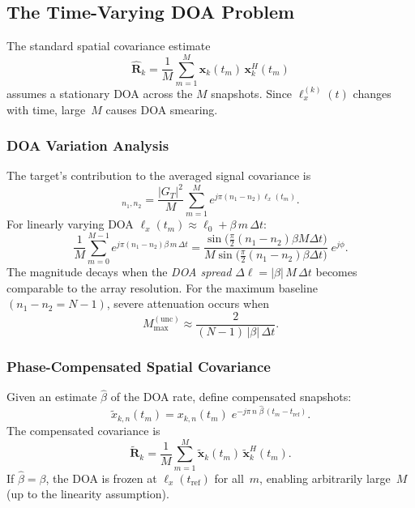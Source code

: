 \documentclass[11pt,a4paper]{article}
\begin{document}
\subsection{The Time-Varying DOA Problem}
\label{sec:tv_doa}

The standard spatial covariance estimate
\begin{equation}
  \hat{\mathbf{R}}_k = \frac{1}{M}\sum_{m=1}^{M}
  \mathbf{x}_k(t_m)\,\mathbf{x}_k^H(t_m)
  \label{eq:cov_standard}
\end{equation}
assumes a stationary DOA across the $M$ snapshots.  Since
$\ell_x^{(k)}(t)$ changes with time, large~$M$ causes DOA smearing.

\subsubsection{DOA Variation Analysis}

The target's contribution to the averaged signal covariance is
\begin{equation}
  [\bar{\mathbf{R}}_{\mathrm{sig}}]_{n_1,n_2}
  = \frac{|G_T|^2}{M}\sum_{m=1}^{M}
  e^{j\pi(n_1-n_2)\ell_x(t_m)}.
  \label{eq:cov_sig}
\end{equation}
For linearly varying DOA $\ell_x(t_m)\approx\ell_0+\beta\,m\,\Delta t$:
\begin{equation}
  \frac{1}{M}\sum_{m=0}^{M-1}e^{j\pi(n_1-n_2)\beta\,m\,\Delta t}
  = \frac{\sin\!\bigl(\tfrac{\pi}{2}(n_1{-}n_2)
  \beta M\Delta t\bigr)}
  {M\sin\!\bigl(\tfrac{\pi}{2}(n_1{-}n_2)\beta\Delta t\bigr)}\;
  e^{j\phi}.
  \label{eq:cov_sum}
\end{equation}
The magnitude decays when the \emph{DOA spread}
$\Delta\ell=|\beta|\,M\,\Delta t$ becomes comparable to the array
resolution.  For the maximum baseline $(n_1{-}n_2=N{-}1)$, severe
attenuation occurs when
\begin{equation}
  M_{\max}^{\mathrm{(unc)}} \approx
  \frac{2}{(N{-}1)\,|\beta|\,\Delta t}.
  \label{eq:Mmax_uncomp}
\end{equation}

\subsubsection{Phase-Compensated Spatial Covariance}
\label{sec:phase_comp}

Given an estimate $\hat{\beta}$ of the DOA rate, define compensated
snapshots:
\begin{equation}
  \boxed{
  \tilde{x}_{k,n}(t_m) = x_{k,n}(t_m)\;
  e^{-j\pi\,n\;\!\hat{\beta}\,(t_m - t_{\mathrm{ref}})}.}
  \label{eq:phase_comp}
\end{equation}
The compensated covariance is
\begin{equation}
  \tilde{\mathbf{R}}_k
  = \frac{1}{M}\sum_{m=1}^{M}
  \tilde{\mathbf{x}}_k(t_m)\,\tilde{\mathbf{x}}_k^H(t_m).
  \label{eq:cov_compensated}
\end{equation}
If $\hat{\beta}=\beta$, the DOA is frozen at
$\ell_x(t_{\mathrm{ref}})$ for all~$m$, enabling arbitrarily
large~$M$ (up to the linearity assumption).
\end{document}
